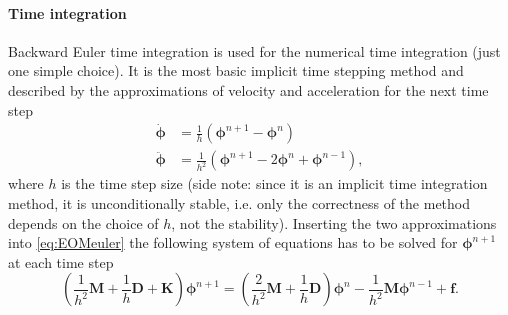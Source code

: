 \paragraph{Time integration}
Backward Euler time integration is used for the numerical time integration (just one simple choice). It is the most basic implicit time stepping method and described by the approximations of velocity and acceleration for the next time step
\begin{align}
	\dot{\boldsymbol{\phi}} &= \frac{1}{h}(\boldsymbol{\phi}^{n+1} - \boldsymbol{\phi}^n )  \label{eq:bevel} \\ 
	\ddot{\boldsymbol{\phi}} &= \frac{1}{h^2}(\boldsymbol{\phi}^{n+1} - 2\boldsymbol{\phi}^n + \boldsymbol{\phi}^{n-1}),\label{eq:beacc}
\end{align}
where $h$ is the time step size (side note: since it is an implicit time integration method, it is unconditionally stable, i.e. only the correctness of the method depends on the choice of $h$, not the stability).
Inserting the two approximations into \eqref{eq:EOMeuler} the following system of equations has to be solved for $\boldsymbol{\phi}^{n+1}$ at each time step
\begin{equation}\label{eq:beequation}
	(\frac{1}{h^2} \boldsymbol{M} + \frac{1}{h}\boldsymbol{D} + \boldsymbol{K}) \boldsymbol{\phi}^{n+1} = (\frac{2}{h^2}\boldsymbol{M} + \frac{1}{h}\boldsymbol{D}) \boldsymbol{\phi}^{n} - \frac{1}{h^2}\boldsymbol{M} \boldsymbol{\phi}^{n-1} + \boldsymbol{f}.
\end{equation}


